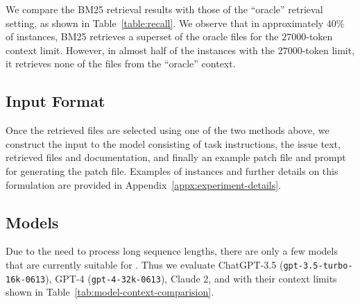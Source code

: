 We compare the BM25 retrieval results with those of the ``oracle'' retrieval setting, as shown in Table~\ref{table:recall}.
We observe that in approximately $40\%$ of instances, BM25 retrieves a superset of the oracle files for the $\num{27000}$-token context limit. However, in almost half of the instances with the $\num{27000}$-token limit, it retrieves none of the files from the ``oracle'' context.

\subsection{Input Format}
\label{sec:experimental-setup:input-format}
Once the retrieved files are selected using one of the two methods above, we construct the input to the model consisting of task instructions, the issue text, retrieved files and documentation, and finally an example patch file and prompt for generating the patch file.
Examples of instances and further details on this formulation are provided in Appendix~\ref{appx:experiment-details}.

\subsection{Models}
\label{sec:experimental-setup:models}
Due to the need to process long sequence lengths, there are only a few models that are currently suitable for  \benchmark{}.
Thus we evaluate ChatGPT-3.5 ({\small \texttt{gpt-3.5-turbo-16k-0613}}), GPT-4 ({\small \texttt{gpt-4-32k-0613}}), Claude 2, and \swellama{} with their context limits shown in Table~\ref{tab:model-context-comparision}.




